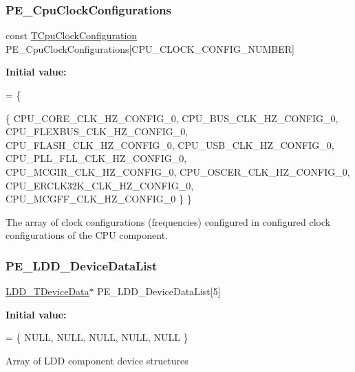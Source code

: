 \subsubsection{\texorpdfstring{P\+E\+\_\+\+Cpu\+Clock\+Configurations}{PE\_CpuClockConfigurations}}
{\footnotesize\ttfamily const \hyperlink{struct_t_cpu_clock_configuration}{T\+Cpu\+Clock\+Configuration} P\+E\+\_\+\+Cpu\+Clock\+Configurations\mbox{[}C\+P\+U\+\_\+\+C\+L\+O\+C\+K\+\_\+\+C\+O\+N\+F\+I\+G\+\_\+\+N\+U\+M\+B\+ER\mbox{]}}

{\bfseries Initial value\+:}
\begin{DoxyCode}
= \{
  
  \{
    CPU\_CORE\_CLK\_HZ\_CONFIG\_0,          
    CPU\_BUS\_CLK\_HZ\_CONFIG\_0,           
    CPU\_FLEXBUS\_CLK\_HZ\_CONFIG\_0,       
    CPU\_FLASH\_CLK\_HZ\_CONFIG\_0,         
    CPU\_USB\_CLK\_HZ\_CONFIG\_0,           
    CPU\_PLL\_FLL\_CLK\_HZ\_CONFIG\_0,       
    CPU\_MCGIR\_CLK\_HZ\_CONFIG\_0,         
    CPU\_OSCER\_CLK\_HZ\_CONFIG\_0,         
    CPU\_ERCLK32K\_CLK\_HZ\_CONFIG\_0,      
    CPU\_MCGFF\_CLK\_HZ\_CONFIG\_0          
  \}
\}
\end{DoxyCode}
The array of clock configurations (frequencies) configured in configured clock configurations of the C\+PU component. \mbox{\label{group___p_e___l_d_d__module_ga1b8ed70cbe26b6b5e879826492ef096d}} 
\subsubsection{\texorpdfstring{P\+E\+\_\+\+L\+D\+D\+\_\+\+Device\+Data\+List}{PE\_LDD\_DeviceDataList}}
{\footnotesize\ttfamily \hyperlink{group___p_e___types__module_gac5cf1362f1f0e3a2ce71b1bf2276d091}{L\+D\+D\+\_\+\+T\+Device\+Data}$\ast$ P\+E\+\_\+\+L\+D\+D\+\_\+\+Device\+Data\+List\mbox{[}5\mbox{]}}

{\bfseries Initial value\+:}
\begin{DoxyCode}
= \{
    NULL,
    NULL,
    NULL,
    NULL,
    NULL
  \}
\end{DoxyCode}
Array of L\+DD component device structures 